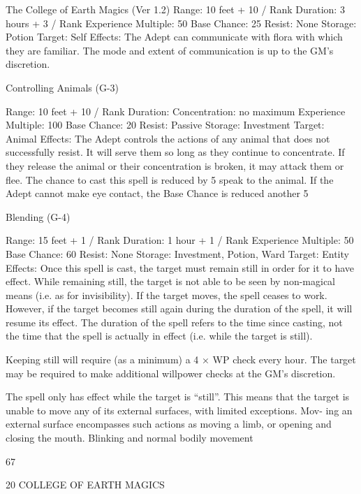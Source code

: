 \begin{Chapter}{The College of Earth Magics (Ver 1.2)}
Range: 10 feet + 10 / Rank 
Duration: 3 hours + 3 / Rank 
Experience Multiple: 50 
Base Chance: 25%
Resist: None 
Storage: Potion 
Target: Self 
Effects:  The  Adept  can  communicate  with  flora 
with which they are familiar. The mode and extent 
of communication is up to the GM’s discretion. 

Controlling Animals (G-3) 

Range: 10 feet + 10 / Rank 
Duration: Concentration: no maximum 
Experience Multiple: 100 
Base Chance: 20%
Resist: Passive 
Storage: Investment 
Target: Animal 
Effects:  The  Adept  controls  the  actions  of  any 
animal  that  does  not  successfully  resist.  It  will 
serve them so long as they continue to concentrate. 
If  they  release  the  animal  or  their  concentration  is 
broken,  it  may  attack  them  or  flee.  The  chance  to 
cast this spell is reduced by 5%
speak to the animal. If the Adept cannot make eye 
contact, the Base Chance is reduced another 5%

Blending (G-4) 

Range: 15 feet + 1 / Rank 
Duration: 1 hour + 1 / Rank 
Experience Multiple: 50 
Base Chance: 60%
Resist: None 
Storage: Investment, Potion, Ward 
Target: Entity 
Effects:  Once  this  spell  is  cast,  the  target  must 
remain  still  in  order  for  it  to  have  effect.  While 
remaining still, the target is not able to be seen by 
non-magical  means  (i.e.  as  for  invisibility).  If  the 
target moves, the spell ceases to work. However, if 
the target becomes still again during the duration of 
the  spell,  it  will  resume  its  effect.  The  duration  of 
the  spell  refers  to  the  time  since  casting,  not  the 
time  that  the  spell  is  actually  in  effect  (i.e.  while 
the target is still). 

Keeping still will require (as a minimum) a 4 × WP 
check  every  hour.  The  target  may  be  required  to 
make  additional  willpower  checks  at  the  GM’s 
discretion. 

The spell only has effect while the target is “still”. 
This means that the target is unable to move any of 
its external surfaces, with limited exceptions. Mov-
ing  an  external  surface  encompasses  such  actions 
as  moving  a  limb,  or  opening  and  closing  the 
mouth.  Blinking  and  normal  bodily  movement 

67 

20 COLLEGE OF EARTH MAGICS 


\end{Chapter}
